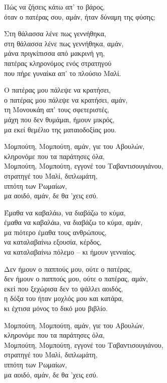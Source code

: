 \begin{lyrics}
Πώς να ζήσεις κάτω απ' το βάρος,\\
όταν ο πατέρας σου, αμάν, ήταν δύναμη της φύσης;

Στη θάλασσα λένε πως γεννήθηκα,\\
στη θάλασσα λένε πως γεννήθηκα, αμάν,\\
μάνα πριγκίπισσα από μακρινή γη,\\
πατέρας κληρονόμος ενός στρατηγού\\
που πήρε γυναίκα απ' το πλούσιο Μαλί.

Ο πατέρας μου πάλεψε να κρατήσει,\\
ο πατέρας μου πάλεψε να κρατήσει, αμάν,\\
τη Μονουκάη απ' τους σφετεριστές,\\
μάχη που δεν θυμάμαι, ήμουν μικρός,\\
μα εκεί θεμέλιο της ματαιοδοξίας μου.

Μομπούτη, Μομπούτη, αμάν, γιε του Αβουλών,\\
κληρονόμε που τα παράτησες όλα,\\
Μομπούτη, Μομπούτη, εγγονέ του Ταβαντισουγιάνου,\\
στρατηγέ του Μαλί, διπλωμάτη,\\
ιππότη των Ρωμαίων,\\
μα αοιδό, αμάν, δε θα 'χεις εσύ.

Έμαθα να καβαλάω, να διαβάζω το κύμα,\\
έμαθα να καβαλάω, να διαβάζω το κύμα, αμάν,\\
μα πιότερο έμαθα τους ανθρώπους,\\
να καταλαβαίνω εξουσία, κέρδος,\\
να καταλαβαίνω πόλεμο -- κι ήμουν γενναίος.

Δεν ήμουν ο παππούς μου, ούτε ο πατέρας,\\
δεν ήμουν ο παππούς μου, ούτε ο πατέρας, αμάν,\\
εκεί που ξεχώρισα δεν το ψάλλει αοιδός,\\
η δόξα του ήταν μοχλός μου και κατάρα,\\
κι έχτισα μόνος το δικό μου βιβλίο.

Μομπούτη, Μομπούτη, αμάν, γιε του Αβουλών,\\
κληρονόμε που τα παράτησες όλα,\\
Μομπούτη, Μομπούτη, εγγονέ του Ταβαντισουγιάνου,\\
στρατηγέ του Μαλί, διπλωμάτη,\\
ιππότη των Ρωμαίων,\\
μα αοιδό, αμάν, δε θα 'χεις εσύ.


\end{lyrics}
